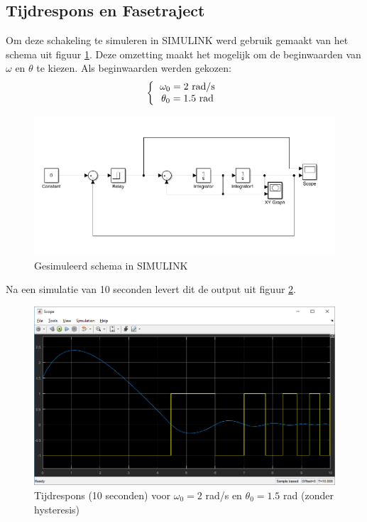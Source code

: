\documentclass[12pt]{article}
\begin{document}
\subsection{Tijdrespons en Fasetraject}
Om deze schakeling te simuleren in SIMULINK werd gebruik gemaakt van het schema uit figuur \ref{simulinkschema}. Deze omzetting maakt het mogelijk om de beginwaarden van $\omega$ en $\theta$ te kiezen. Als beginwaarden werden gekozen:
\[ 
\left \{
  \begin{tabular}{c}
  $\omega_0 = 2$ rad/s \\
  $\theta_0 = 1.5$ rad
  \end{tabular}
\right. 
\]
\begin{figure}[]
	\centering
	\includegraphics[width=\textwidth, keepaspectratio]{simulinkschema.png}
	\caption{Gesimuleerd schema in SIMULINK}
	\label{simulinkschema}
\end{figure}
Na een simulatie van 10 seconden levert dit de output uit figuur \ref{output1}.
\begin{figure}[]
	\centering
	\includegraphics[width=\textwidth, keepaspectratio]{output1.png}
	\caption{Tijdrespons (10 seconden) voor $\omega_0 = 2$ rad/s en $\theta_0 = 1.5$ rad (zonder hysteresis)}
	\label{output1}
\end{figure}
\end{document}
